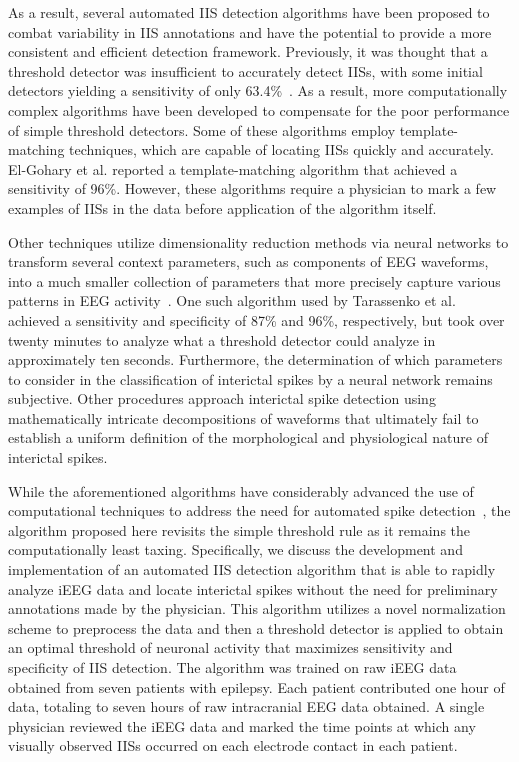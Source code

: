\documentclass[letterpaper, 10pt, conference]{ieeeconf}      %
\begin{document}
As a result, several automated IIS detection algorithms have been proposed to combat variability in IIS annotations and have the potential to provide a more consistent and efficient detection framework. Previously, it was thought that a threshold detector was insufficient to accurately detect IISs, with some initial detectors yielding a sensitivity of only 63.4\%~\cite{c6}. As a result, more computationally complex algorithms have been developed to compensate for the poor performance of simple threshold detectors. Some of these algorithms employ template-matching techniques, which are capable of locating IISs quickly and accurately. El-Gohary et al. \cite{c4} reported a template-matching algorithm that achieved a sensitivity of 96\%. However, these algorithms require a physician to mark a few examples of IISs in the data before application of the algorithm itself.

Other techniques utilize dimensionality reduction methods via neural networks to transform several context parameters, such as components of EEG waveforms, into a much smaller collection of parameters that more precisely capture various patterns in EEG activity~\cite{c8}. One such algorithm used by Tarassenko et al. \cite{c10} achieved a sensitivity and specificity of 87\% and 96\%, respectively, but took over twenty minutes to analyze what a threshold detector could analyze in approximately ten seconds. Furthermore, the determination of which parameters to consider in the classification of interictal spikes by a neural network remains subjective. Other procedures approach interictal spike detection using mathematically intricate decompositions of waveforms that ultimately fail to establish a uniform definition of the morphological and physiological nature of interictal spikes. 

While the aforementioned algorithms have considerably advanced the use of computational techniques to address the need for automated spike detection~\cite{c1,c11,c3}, the algorithm proposed here revisits the simple threshold rule as it remains the computationally least taxing. Specifically, we discuss the development and implementation of an automated IIS detection algorithm that is able to rapidly analyze iEEG data and locate interictal spikes without the need for preliminary annotations made by the physician. This algorithm utilizes a novel normalization scheme to preprocess the data and then a threshold detector is applied to obtain an optimal threshold of neuronal activity that maximizes sensitivity and specificity of IIS detection. The algorithm was trained on raw iEEG data obtained from seven patients with epilepsy. Each patient contributed one hour of data, totaling to seven hours of raw intracranial EEG data obtained. A single physician reviewed the iEEG data and marked the time points at which any visually observed IISs occurred on each electrode contact in each patient.
\end{document}
